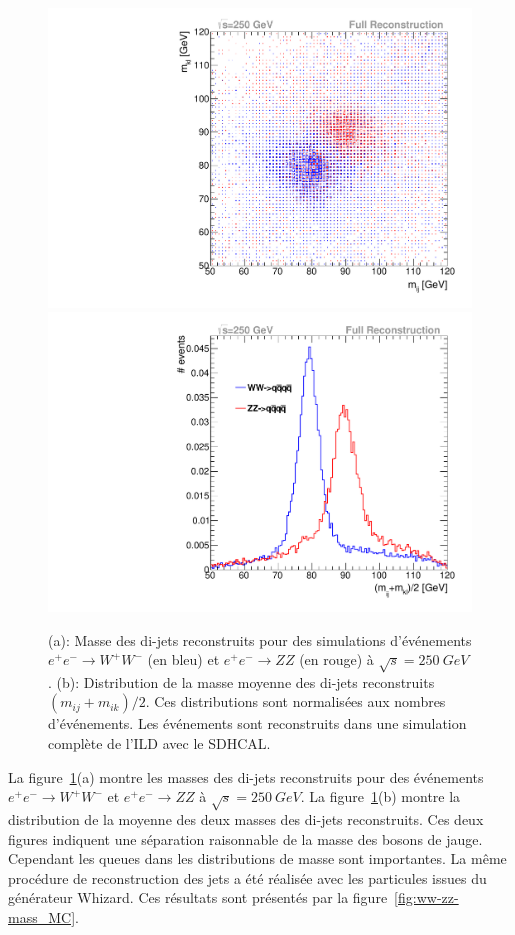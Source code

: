 \begin{figure}[!ht]
  \includegraphics[width=.49\textwidth]{ILD/figs/mIJ_vs_mKL.pdf}
  \includegraphics[width=.49\textwidth]{ILD/figs/mass_distrib.pdf}
  \caption{(a): Masse des di-jets reconstruits pour des simulations d'événements $e^+e^-\rightarrow W^+W^-$ (en bleu) et $e^+e^-\rightarrow ZZ$ (en rouge) à $\sqrt{s}=250~GeV$. (b): Distribution de la masse moyenne des di-jets reconstruits $(m_{ij}+m_{ik})/2$. Ces distributions sont normalisées aux nombres d'événements. Les événements sont reconstruits dans une simulation complète de l'ILD avec le SDHCAL.}
  \label{fig:ww-zz-mass}
\end{figure}
La figure~\ref{fig:ww-zz-mass}(a) montre les masses des di-jets reconstruits pour des événements $e^+e^-\rightarrow W^+W^-$ et $e^+e^-\rightarrow ZZ$ à $\sqrt{s}=250~GeV$. La figure~\ref{fig:ww-zz-mass}(b) montre la distribution de la moyenne des deux masses des di-jets reconstruits. Ces deux figures indiquent une séparation raisonnable de la masse des bosons de jauge. Cependant les queues dans les distributions de masse sont importantes. La même procédure de reconstruction des jets a été réalisée avec les particules issues du générateur Whizard. Ces résultats sont présentés par la figure~\ref{fig:ww-zz-mass_MC}.
